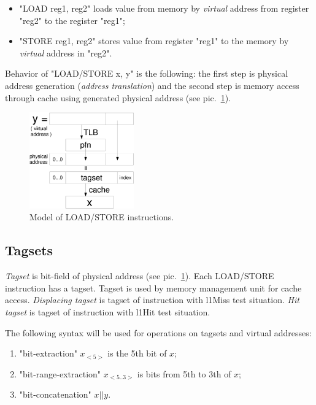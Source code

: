 \documentclass[times, 10pt,twocolumn]{article}
\begin{document}
\begin{itemize}
\item "LOAD reg1, reg2" loads value from memory by \emph{virtual} address from register "reg2" to the register "reg1";
\item "STORE reg1, reg2" stores value from register "reg1" to the
memory by \emph{virtual} address in "reg2".
\end{itemize}

Behavior of "LOAD/STORE x, y" is the following: the first step is
physical address generation (\emph{address translation}) and the
second step is memory access through cache using generated physical address (see pic.~\ref{LOAD}).

\begin{figure}[h]\label{LOAD}
\includegraphics[width=0.4\textwidth]{load}
\caption{Model of LOAD/STORE instructions.}
\end{figure} %

\subsection{Tagsets}

\emph{Tagset} is bit-field of physical address (see pic.~\ref{LOAD}). Each LOAD/STORE instruction has a tagset. Tagset is used by memory management unit for cache access.
\emph{Displacing tagset} is tagset of instruction with l1Miss test situation. \emph{Hit tagset} is tagset of instruction with l1Hit test situation.

The following syntax will be used for operations on tagsets and virtual addresses:
\begin{enumerate}
\item "bit-extraction" $x_{<5>}$ is the 5th bit of $x$;
\item "bit-range-extraction" $x_{<5..3>}$ is bits from 5th to 3th of $x$;
\item "bit-concatenation" $x||y$.
\end{enumerate}
\end{document}
